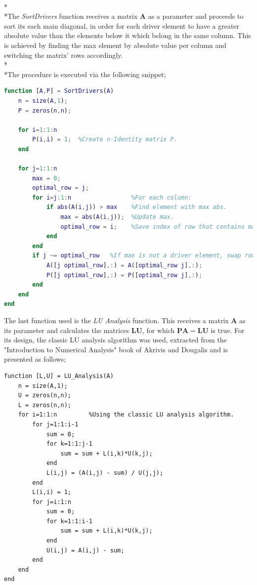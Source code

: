 \documentclass{article}
\begin{document}
\\*\\*The \emph{SortDrivers} function receives a matrix $\mathbf{A}$ as a parameter and proceeds to sort its each
main diagonal, in order for each driver element to have a greater absolute value than the elements below it
which belong in the same column. This is achieved by finding the max element by absolute value per column
and switching the matrix' rows accordingly.
\\*\\*The procedure is executed via the following snippet;
\begin{lstlisting}[language=Matlab]
function [A,P] = SortDrivers(A)
    n = size(A,1);
    P = zeros(n,n);
    
    for i=1:1:n
        P(i,i) = 1;  %Create n-Identity matrix P.
    end
    
    for j=1:1:n
        max = 0;
        optimal_row = j;
        for i=j:1:n                 %For each column:        
            if abs(A(i,j)) > max    %Find element with max abs.
                max = abs(A(i,j));  %Update max.
                optimal_row = i;    %Save index of row that contains max.
            end
        end
        if j ~= optimal_row   %If max is not a driver element, swap rows.
            A([j optimal_row],:) = A([optimal_row j],:);
            P([j optimal_row],:) = P([optimal_row j],:);
        end
    end
end
\end{lstlisting}
\pagebreak
The last function used is the \emph{LU Analysis} function. This receives a matrix $\mathbf{A}$ as its parameter and calculates the matrices $\mathbf{LU}$, for which $\mathbf{PA = LU}$ is true. For its design, the classic LU analysis algorithm was used, extracted from the "Introduction to Numerical Analysis" book of Akrivis and Dougalis and is presented as follows;
\begin{lstlisting}
function [L,U] = LU_Analysis(A)       
    n = size(A,1);
    U = zeros(n,n);
    L = zeros(n,n);
    for i=1:1:n         %Using the classic LU analysis algorithm.
        for j=1:1:i-1
            sum = 0;
            for k=1:1:j-1
                sum = sum + L(i,k)*U(k,j);
            end
            L(i,j) = (A(i,j) - sum) / U(j,j);
        end
        L(i,i) = 1;
        for j=i:1:n
            sum = 0;
            for k=1:1:i-1
                sum = sum + L(i,k)*U(k,j);
            end
            U(i,j) = A(i,j) - sum;
        end
    end
end
\end{lstlisting}
\end{document}
